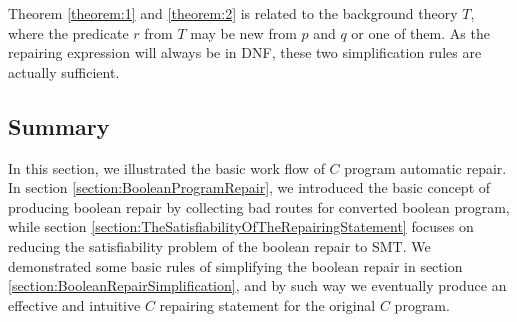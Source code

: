 Theorem \ref{theorem:1} and \ref{theorem:2} is related to the background theory $T$, where the predicate $r$ from $T$ may be new from $p$ and $q$ or one of them.
As the repairing expression will always be in DNF, these two simplification rules are actually sufficient.

\subsection{Summary}
In this section, we illustrated the basic work flow of $C$ program automatic repair. In section \ref{section:BooleanProgramRepair}, we introduced the basic concept of producing boolean repair by collecting bad routes for converted boolean program,
while section \ref{section:TheSatisfiabilityOfTheRepairingStatement} focuses on reducing the satisfiability problem of the boolean repair to SMT. We demonstrated some basic rules of simplifying the boolean repair in section \ref{section:BooleanRepairSimplification}, and by such way we eventually produce an effective and intuitive $C$ repairing statement for the original $C$ program.
